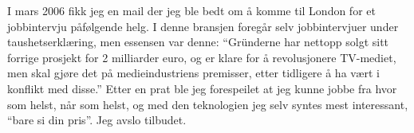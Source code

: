 
I mars 2006 fikk jeg en mail der jeg ble bedt om å komme til London
for et jobbintervju påfølgende helg. I denne bransjen foregår selv
jobbintervjuer under taushetserklæring, men essensen var denne:
``Gründerne har nettopp solgt sitt forrige prosjekt for 2 milliarder
euro, og er klare for å revolusjonere TV-mediet, men skal gjøre det på
medieindustriens premisser, etter tidligere å ha vært i konflikt med
disse.'' Etter en prat ble jeg forespeilet at jeg kunne jobbe fra
hvor som helst, når som helst, og med den teknologien jeg selv syntes
mest interessant, ``bare si din pris''. Jeg avslo tilbudet.
